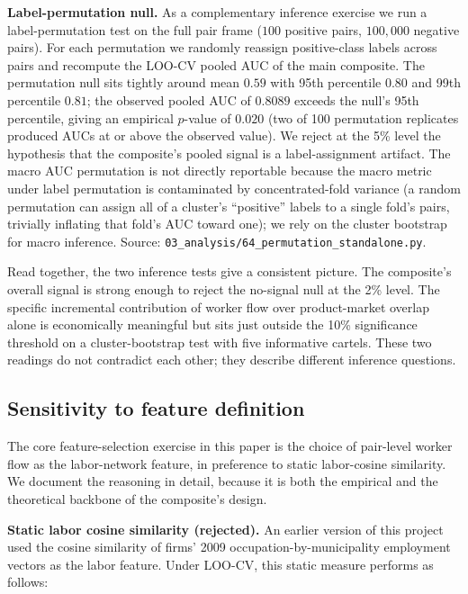 \textbf{Label-permutation null.} As a complementary inference exercise we run a label-permutation test on the full pair frame ($100$ positive pairs, $100{,}000$ negative pairs). For each permutation we randomly reassign positive-class labels across pairs and recompute the LOO-CV pooled AUC of the main composite. The permutation null sits tightly around mean $0.59$ with 95th percentile $0.80$ and 99th percentile $0.81$; the observed pooled AUC of $0.8089$ exceeds the null's 95th percentile, giving an empirical $p$-value of $\mathbf{0.020}$ (two of 100 permutation replicates produced AUCs at or above the observed value). We reject at the 5\% level the hypothesis that the composite's pooled signal is a label-assignment artifact. The macro AUC permutation is not directly reportable because the macro metric under label permutation is contaminated by concentrated-fold variance (a random permutation can assign all of a cluster's ``positive'' labels to a single fold's pairs, trivially inflating that fold's AUC toward one); we rely on the cluster bootstrap for macro inference. Source: \texttt{03\_analysis/64\_permutation\_standalone.py}.

Read together, the two inference tests give a consistent picture. The composite's overall signal is strong enough to reject the no-signal null at the 2\% level. The specific incremental contribution of worker flow over product-market overlap alone is economically meaningful but sits just outside the 10\% significance threshold on a cluster-bootstrap test with five informative cartels. These two readings do not contradict each other; they describe different inference questions.

\subsection{Sensitivity to feature definition}\label{sec:rob_features}

The core feature-selection exercise in this paper is the choice of pair-level worker flow as the labor-network feature, in preference to static labor-cosine similarity. We document the reasoning in detail, because it is both the empirical and the theoretical backbone of the composite's design.

\textbf{Static labor cosine similarity (rejected).} An earlier version of this project used the cosine similarity of firms' 2009 occupation-by-municipality employment vectors as the labor feature. Under LOO-CV, this static measure performs as follows:

